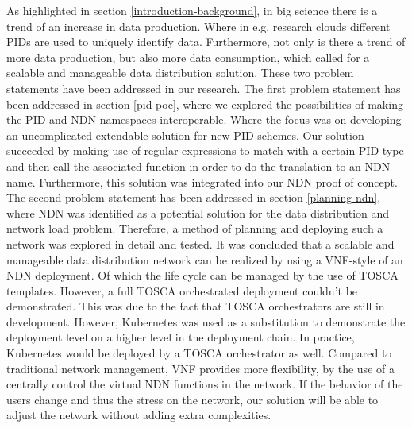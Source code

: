 As highlighted in section \ref{introduction-background}, in big science there is a trend of an increase in data production. Where in e.g. research clouds different PIDs are used to uniquely identify data. Furthermore, not only is there a trend of more data production, but also more data consumption, which called for a scalable and manageable data distribution solution. These two problem statements have been addressed in our research. The first problem statement has been addressed in section \ref{pid-poc}, where we explored the possibilities of making the PID and NDN namespaces interoperable. Where the focus was on developing an uncomplicated extendable solution for new PID schemes. Our solution succeeded by making use of regular expressions to match with a certain PID type and then call the associated function in order to do the translation to an NDN name. Furthermore, this solution was integrated into our NDN proof of concept. The second problem statement has been addressed in section \ref{planning-ndn}, where NDN was identified as a potential solution for the data distribution and network load problem. Therefore, a method of planning and deploying such a network was explored in detail and tested. It was concluded that a scalable and manageable data distribution network can be realized by using a VNF-style of an NDN deployment. Of which the life cycle can be managed by the use of TOSCA templates. However, a full TOSCA orchestrated deployment couldn't be demonstrated. This was due to the fact that TOSCA orchestrators are still in development. However, Kubernetes was used as a substitution to demonstrate the deployment level on a higher level in the deployment chain. In practice, Kubernetes would be deployed by a TOSCA orchestrator as well. Compared to traditional network management, VNF provides more flexibility, by the use of a centrally control the virtual NDN functions in the network. If the behavior of the users change and thus the stress on the network, our solution will be able to adjust the network without adding extra complexities.







